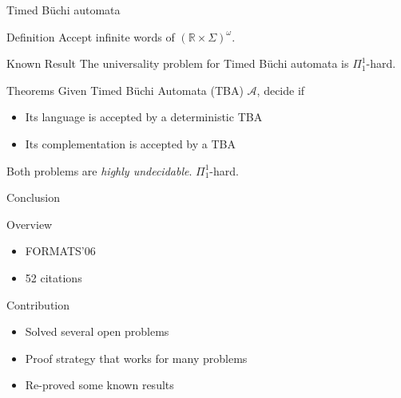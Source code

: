 \begin{frame}{Timed B\"uchi automata}
  \begin{block}{Definition}
    Accept infinite words of $(\mathbb{R}\times\Sigma)^\omega$.
  \end{block}
  \vfill
  \begin{alertblock}{Known Result}
    The universality problem for Timed B\"uchi automata is $\Pi^1_1$-hard.
  \end{alertblock}
  \vfill
  \begin{exampleblock}{Theorems}
    Given Timed B\"uchi Automata (TBA) $\mathcal{A}$, decide if
    \begin{itemize}
    \item Its language is accepted by a deterministic TBA
    \item Its complementation is accepted by a TBA
    \end{itemize}
    Both problems are \textit{highly undecidable}. $\Pi^1_1$-hard.
  \end{exampleblock}

\end{frame}

\begin{frame}{Conclusion}
  \begin{block}{Overview}
    \begin{itemize}
    \item FORMATS'06
    \item 52 citations
    \end{itemize}
  \end{block}
  \vfill
  \begin{exampleblock}{Contribution}
    \begin{itemize}
    \item Solved several open problems
    \item Proof strategy that works for many problems
    \item Re-proved some known results
    \end{itemize}
  \end{exampleblock}
\end{frame}
